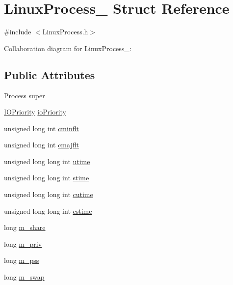 \hypertarget{structLinuxProcess__}{}\section{Linux\+Process\+\_\+ Struct Reference}
\label{structLinuxProcess__}


{\ttfamily \#include $<$Linux\+Process.\+h$>$}



Collaboration diagram for Linux\+Process\+\_\+\+:
\subsection*{Public Attributes}
\begin{DoxyCompactItemize}
\item 
\hyperlink{Process_8h_a20673e8fa40981a168bf0e196c4cef3b}{Process} \hyperlink{structLinuxProcess___a18bbf5ea6ea250f752bf4cfb901b92da}{super}
\item 
\hyperlink{IOPriority_8h_a7f26835a9d854333f7dc5d7321922975}{I\+O\+Priority} \hyperlink{structLinuxProcess___a141ffbf6e27674a3424166fb363be304}{io\+Priority}
\item 
unsigned long int \hyperlink{structLinuxProcess___a8e009d8dae2a05aa09377b6eb853b558}{cminflt}
\item 
unsigned long int \hyperlink{structLinuxProcess___afa355baa02ad206e1873aa152bd1b264}{cmajflt}
\item 
unsigned long long int \hyperlink{structLinuxProcess___a75516dac31570653ea0101b4a631d7d5}{utime}
\item 
unsigned long long int \hyperlink{structLinuxProcess___ac843f0feb06dd81345d7e261216b20db}{stime}
\item 
unsigned long long int \hyperlink{structLinuxProcess___a2b5d50520c2a7a9643bbc1ad4b282316}{cutime}
\item 
unsigned long long int \hyperlink{structLinuxProcess___a4f84bb96a6aa2689cc0e92703dcfc6c4}{cstime}
\item 
long \hyperlink{structLinuxProcess___a350eb74f2652dbc5271dd4b6b9dbdfc8}{m\+\_\+share}
\item 
long \hyperlink{structLinuxProcess___ae3a219a917d99f416bb4137f4aca3f5d}{m\+\_\+priv}
\item 
long \hyperlink{structLinuxProcess___a40f46e2563e28053af64d98f718579f2}{m\+\_\+pss}
\item 
long \hyperlink{structLinuxProcess___aae2a3525379b98baa1b1de6ec04016b8}{m\+\_\+swap}
\item 

\end{DoxyCompactItemize}
